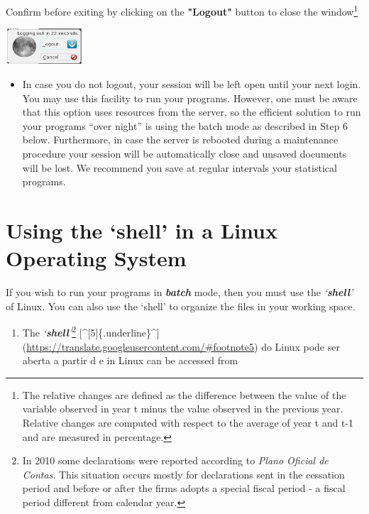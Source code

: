 \documentclass[]{book}
\providecommand{\tightlist}{%
  \setlength{\itemsep}{0pt}\setlength{\parskip}{0pt}}
\let\rmarkdownfootnote\footnote%
\def\footnote{\protect\rmarkdownfootnote}
\begin{document}
Confirm before exiting by clicking on the \textbf{"Logout"} button to close the window\footnote{The relative changes are defined as the difference between the value of the variable observed in year t minus the value observed in the previous year. Relative changes are computed with respect to the average of year t and t-1 and are measured in percentage.}

\includegraphics[width=1.14236in,height=0.52288in]{./media/image8.png}

\begin{itemize}
\tightlist
\item
  In case you do not logout, your session will be left open until your
  next login. You may use this facility to run your programs. However,
  one must be aware that this option uses resources from the server,
  so the efficient solution to run your programs ``over night'' is using
  the batch mode as described in Step 6 below. Furthermore, in case
  the server is rebooted during a maintenance procedure your session
  will be automatically close and unsaved documents will be lost. We
  recommend you save at regular intervals your statistical programs.
\end{itemize}

\hypertarget{using-the-shell-in-a-linux-operating-system}{%
\section{\texorpdfstring{{Using the `shell' in a Linux Operating System}}{Using the `shell' in a Linux Operating System}}\label{using-the-shell-in-a-linux-operating-system}}

If you wish to run your
programs in \textbf{\emph{{batch}}} mode, then you must use the
\emph{`\textbf{shell}'} of Linux. You can also use the `shell' to organize the
files in your working space.

\begin{enumerate}
\def\labelenumi{\arabic{enumi}.}
\tightlist
\item
  The \emph{`\textbf{shell}'}\footnote{In 2010 some declarations were reported according to \emph{Plano Oficial de Contas}. This situation occurs mostly for declarations sent in the cessation period and before or after the firms adopts a special fiscal period - a fiscal period different from calendar year.}
  {[}\^{}{[}5{]}\{.underline\}\^{}{]}(\url{https://translate.googleusercontent.com/\#footnote5})
  do Linux pode ser aberta a partir d e in Linux can be accessed from
\end{enumerate}
\end{document}
